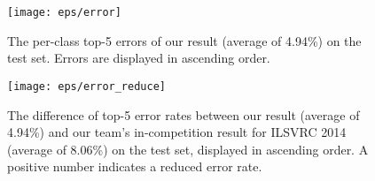 \documentclass[10pt,twocolumn,letterpaper]{article}
\begin{document}
\begin{figure}[t]
\begin{center}
\texttt{[image: eps/error]}
\end{center}
\caption{The per-class top-5 errors of our result (average of 4.94\%) on the test set. Errors are displayed in ascending order.}
\label{fig:error}
\begin{center}
\texttt{[image: eps/error\_reduce]}
\end{center}
\caption{The difference of top-5 error rates between our result (average of 4.94\%) and our team's in-competition result for ILSVRC 2014 (average of 8.06\%) on the test set, displayed in ascending order. A positive number indicates a reduced error rate.}
\label{fig:error_reduce}
\end{figure}

{\small


}
\end{document}
